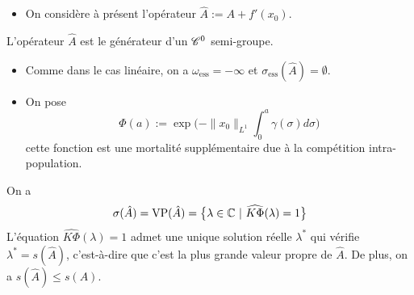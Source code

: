 \begin{frame}
    \begin{itemize}
        \item On considère à présent l'opérateur $\hat{A} := A + f'(x_0)$.
    \end{itemize}
    \begin{proposition}
        L'opérateur $\hat{A}$ est le générateur d'un $\mathscr{C}^0$ semi-groupe.
    \end{proposition}
    \pause
    \begin{itemize}
        \item Comme dans le cas linéaire, on a $\omega_{\text{ess}} = -\infty$ et $\sigma_{\text{ess}}(\hat{A})=\emptyset$. \pause
        \item On pose 
        \begin{equation*}
            \Phi(a) := \exp\bigg(-\|x_0\|_{L^1}\int_0^a\gamma(\sigma)d \sigma\bigg)
        \end{equation*}
        cette fonction est une mortalité supplémentaire due à la compétition intra-population. \pause
    \end{itemize}
    \begin{theorem}
        On a 
        \begin{equation*}
            \sigma(\hat{A}) = \mathrm{VP}(\hat{A}) = \big\{\lambda \in \bbC \ | \ \widehat{K\Phi}(\lambda)=1\big\}
        \end{equation*}
        L'équation $\widehat{K\Phi}(\lambda)=1$ admet une unique solution réelle $\lambda^*$ qui vérifie $\lambda^*=s(\hat{A})$, c'est-à-dire que c'est la plus grande valeur propre de $\hat{A}$. De plus, on a $s(\hat{A}) \leq s(A)$.
    \end{theorem}
\end{frame}

